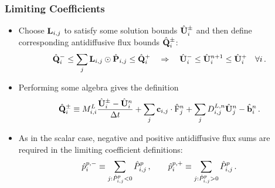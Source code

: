 \documentclass{beamer} \useoutertheme{infolines}
\begin{document}
\begin{frame}
\frametitle{Limiting Coefficients}

\begin{itemize}
  \item Choose $\mathbf{L}_{i,j}$ to satisfy some solution bounds
    $\hat{\mathbf{U}}_{i}^\pm$ and then define corresponding
    antidiffusive flux bounds $\hat{\mathbf{Q}}_i^\pm$:
    \begin{equation}
      \hat{\mathbf{\limitedfluxbound}}^-_i \leq
        \sum\limits_j \limitermatrix\ij\odot\hat{\correctionfluxmatrix}\ij \leq
        \hat{\mathbf{\limitedfluxbound}}^+_i
      \quad\Rightarrow\quad
      \hat{\solutionvector}_i^- \leq
        \hat{\solutionvector}_i^{n+1} \leq
        \hat{\solutionvector}_i^+ \quad \forall i \eqp
    \end{equation}
  \item Performing some algebra gives the definition
    \begin{equation}
      \hat{\mathbf{\limitedfluxbound}}_i^\pm \equiv
        \lumpedmassentry\frac{\hat{\solutionvector}_i^\pm
          -\hat{\solutionvector}_i^n}{\dt}
        + \sum_j\gradiententry\cdot\hat{\consfluxinterpolant}_j^n
        + \sum_j\diffusionmatrixletter\ij^{L,n}\hat{\solutionvector}_j^n
        - \hat{\ssrhs}_i^n \eqp
    \end{equation}
  \item As in the scalar case, negative and positive antidiffusive flux
    sums are required in the limiting coefficient definitions:
    \begin{equation}
      \hat{\correctionfluxletter}_i^{\componentindex,-} \equiv
        \sum\limits_{j:\hat{\correctionfluxentry}\ij^\componentindex<0}
        \hat{\correctionfluxentry}\ij^\componentindex \eqc \qquad
      \hat{\correctionfluxletter}_i^{\componentindex,+} \equiv
        \sum\limits_{j:\hat{\correctionfluxentry}\ij^\componentindex>0}
        \hat{\correctionfluxentry}\ij^\componentindex \eqp
    \end{equation}
\end{itemize}

\end{frame}
\end{document}
